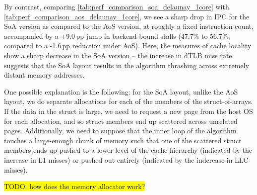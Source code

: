 By contrast, comparing \cref{tab:perf_comparison_soa_delaunay_1core} with
\cref{tab:perf_comparison_aos_delaunay_1core}, we see a sharp drop in IPC for
the SoA version as compared to the AoS version, at roughly a fixed instruction
count, accompanied by a +9.0\,pp jump in backend-bound stalls (47.7\% to 56.7\%,
compared to a -1.6\,pp reduction under AoS). Here, the measures of cache locality show a sharp decrease in the SoA
version -- the increase in dTLB miss rate suggests that the SoA layout results
in the algorithm thrashing across extremely distant memory addresses.

One possible explanation is the following: for the SoA layout, unlike the AoS
layout, we do separate allocations for each of the members of the
struct-of-arrays. If the data in the struct is large, we need to request a new
page from the host OS for each allocation, and so struct members end up
scattered across unrelated pages. Additionally, we need to suppose that the
inner loop of the algorithm touches a large-enough chunk of memory such that one
of the scattered struct members ends up pushed to a lower level of the cache
hierarchy (indicated by the increase in L1 misses) or pushed out entirely
(indicated by the indcrease in LLC misses).

\hl{TODO: how does the memory allocator work?}

